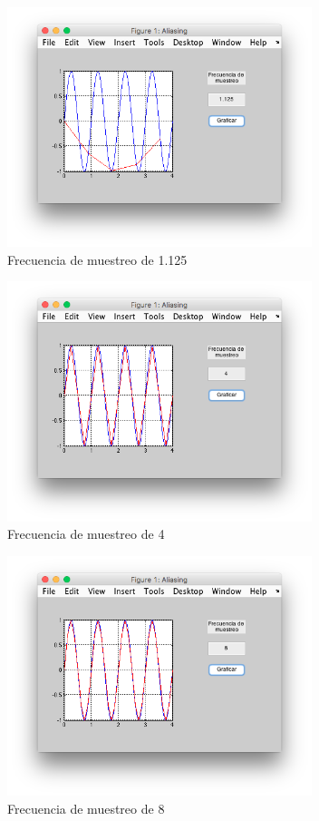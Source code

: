 \documentclass[comsoc, journal]{IEEEtran}
\begin{document}
\begin{figure}[!t]
\centering
\includegraphics[width=3.5in]{imgs/aliasing_125.png}
\caption{Frecuencia de muestreo de 1.125}
\label{fig_al_125}
\end{figure}

\begin{figure}[!t]
\centering
\includegraphics[width=3.5in]{imgs/aliasing_4.png}
\caption{Frecuencia de muestreo de 4}
\label{fig_al_4}
\end{figure}

\begin{figure}[!t]
\centering
\includegraphics[width=3.5in]{imgs/aliasing_8.png}
\caption{Frecuencia de muestreo de 8}
\label{fig_al_8}
\end{figure}
\end{document}
